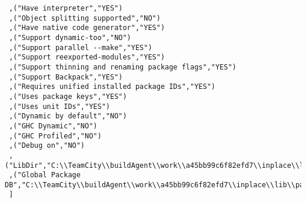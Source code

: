 \begin{verbatim}
 ,("Have interpreter","YES")
 ,("Object splitting supported","NO")
 ,("Have native code generator","YES")
 ,("Support dynamic-too","NO")
 ,("Support parallel --make","YES")
 ,("Support reexported-modules","YES")
 ,("Support thinning and renaming package flags","YES")
 ,("Support Backpack","YES")
 ,("Requires unified installed package IDs","YES")
 ,("Uses package keys","YES")
 ,("Uses unit IDs","YES")
 ,("Dynamic by default","NO")
 ,("GHC Dynamic","NO")
 ,("GHC Profiled","NO")
 ,("Debug on","NO")
 ,("LibDir","C:\\TeamCity\\buildAgent\\work\\a45bb99c6f82efd7\\inplace\\lib")
 ,("Global Package DB","C:\\TeamCity\\buildAgent\\work\\a45bb99c6f82efd7\\inplace\\lib\\package.conf.d")
 ]
\end{verbatim}
